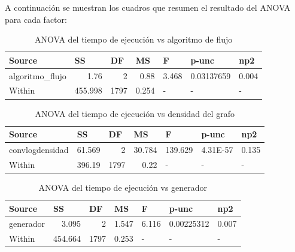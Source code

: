 \documentclass{article}
\begin{document}
A continuación se muestran los cuadros que resumen el resultado del ANOVA para cada factor:

\begin{table}[htbp]
  \centering
  \caption{ANOVA del tiempo de ejecución vs algoritmo de flujo}
    \begin{tabular}{lrrrlll}
    \toprule
    \textbf{Source} & \multicolumn{1}{l}{\textbf{SS}} & \multicolumn{1}{l}{\textbf{DF}} & \multicolumn{1}{l}{\textbf{MS}} & \textbf{F} & \textbf{p-unc} & \textbf{np2} \\
    \midrule
    algoritmo\_flujo & 1.76  & 2     & 0.88  & \multicolumn{1}{r}{3.468} & \multicolumn{1}{r}{0.03137659} & \multicolumn{1}{r}{0.004} \\
    Within & 455.998 & 1797  & 0.254 & -     & -     & - \\
    \bottomrule
    \end{tabular}%
  \label{tab:addlabel}%
\end{table}%

\begin{table}[htbp]
  \centering
  \caption{ANOVA del tiempo de ejecución vs densidad del grafo}
    \begin{tabular}{lrrrlll}
    \toprule
    \textbf{Source} & \multicolumn{1}{l}{\textbf{SS}} & \multicolumn{1}{l}{\textbf{DF}} & \multicolumn{1}{l}{\textbf{MS}} & \textbf{F} & \textbf{p-unc} & \textbf{np2} \\
    \midrule
    convlogdensidad & 61.569 & 2     & 30.784 & \multicolumn{1}{r}{139.629} & \multicolumn{1}{r}{4.31E-57} & \multicolumn{1}{r}{0.135} \\
    Within & 396.19 & 1797  & 0.22  & -     & -     & - \\
    \bottomrule
    \end{tabular}%
  \label{tab:addlabel}%
\end{table}%

\begin{table}[htbp]
  \centering
  \caption{ANOVA del tiempo de ejecución vs generador}
    \begin{tabular}{lrrrlll}
    \toprule
    \textbf{Source} & \multicolumn{1}{l}{\textbf{SS}} & \multicolumn{1}{l}{\textbf{DF}} & \multicolumn{1}{l}{\textbf{MS}} & \textbf{F} & \textbf{p-unc} & \textbf{np2} \\
    \midrule
    generador & 3.095 & 2     & 1.547 & \multicolumn{1}{r}{6.116} & \multicolumn{1}{r}{0.00225312} & \multicolumn{1}{r}{0.007} \\
    Within & 454.664 & 1797  & 0.253 & -     & -     & - \\
    \bottomrule
    \end{tabular}%
  \label{tab:addlabel}%
\end{table}%
\end{document}
